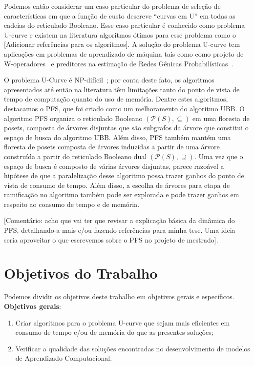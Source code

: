 Podemos então considerar um caso particular do problema de seleção de
características em que a função de custo descreve ``curvas em U''
em todas as cadeias do reticulado Booleano. Esse caso particular é 
conhecido como problema U-curve e existem na literatura algoritmos 
ótimos para esse problema como o  {\color{blue}[Adicionar referências para os algoritmos]}. A solução do 
problema U-curve tem aplicações em problemas de aprendizado de máquina tais como como projeto
de W-operadores~\cite{MJCJJB} e preditores na estimação de Redes Gênicas 
Probabilísticas~\cite{BCJMJ07}.

O problema U-Curve é NP-difícil~\cite{REI12}; por conta deste fato, os algoritmos 
apresentados até então na literatura têm limitações tanto do ponto de vista de
tempo de computação quanto do uso de memória. Dentre estes algoritmos,
destacamos o PFS, que foi criado como um melhoramento do algoritmo UBB. 
O algoritmo PFS organiza o reticulado Booleano $(\mathcal{P}(S),\subseteq)$ em uma floresta de posets, composta de árvores disjuntas que são subgrafos da árvore que constitui o espaço de busca do algoritmo UBB. Além disso, PFS também mantém uma floresta de posets composta de árvores induzidas a partir de uma árvore construída a partir do reticulado Booleano dual $(\mathcal{P}(S),\supseteq)$. Uma vez que o espaço de busca é composto de várias árvores disjuntas, parece razoável a hipótese de que a paralelização 
desse algoritmo possa trazer ganhos do ponto de vista de consumo de 
tempo. Além disso, a escolha de árvores para etapa de ramificação no 
algoritmo também pode ser explorada e pode trazer ganhos em respeito ao
consumo de tempo e de memória.

{\color{blue}[Comentário: acho que vai ter que revisar a explicação básica da dinâmica do PFS, detalhando-a mais e/ou fazendo referências para minha tese. Uma ideia seria aproveitar o que escrevemos sobre o PFS no projeto de mestrado]}.

\section{Objetivos do Trabalho}
Podemos dividir os objetivos deste trabalho em objetivos gerais e 
específicos.\\

{\bf Objetivos gerais}:
\begin{enumerate}
\item{Criar algoritmos para o problema U-curve que sejam mais eficientes
em consumo de tempo e/ou de memória do que as presentes soluções;}
\item{Verificar a qualidade das soluções encontradas no desenvolvimento
de modelos de Aprendizado Computacional.}
\end{enumerate}

